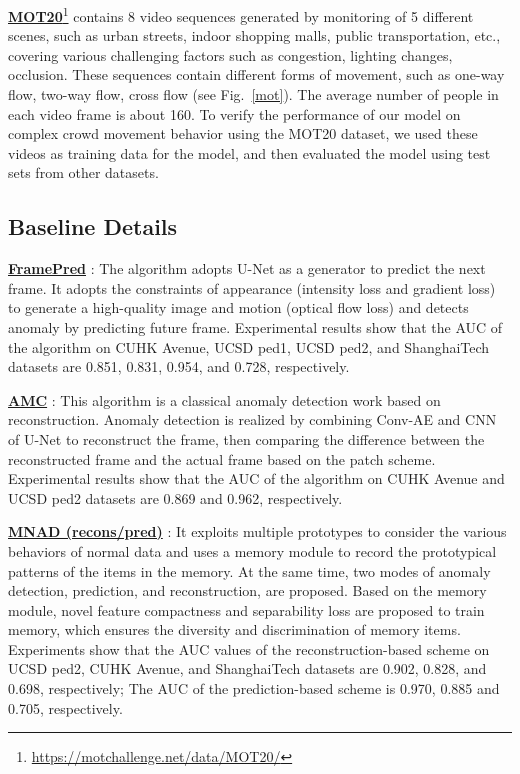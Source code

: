 \documentclass[journal]{IEEEtran}
\begin{document}
\vskip 0.1in
\noindent 
\underline{\textbf{MOT20}}\footnote{\url{https://motchallenge.net/data/MOT20/}} contains 8 video sequences generated by monitoring of 5 different scenes, such as urban streets, indoor shopping malls, public transportation, etc., covering various challenging factors such as congestion, lighting changes, occlusion. These sequences contain different forms of movement, such as one-way flow, two-way flow, cross flow (see Fig.~\ref{mot}). The average number of people in each video frame is about 160. To verify the performance of our model on complex crowd movement behavior using the MOT20 dataset, we used these videos as training data for the model, and then evaluated the model using test sets from other datasets.

\thispagestyle{empty}
\subsection{Baseline Details}\label{appendix:baselines}

\noindent \underline{\textbf{FramePred}} \cite{liu2018future}: The algorithm adopts U-Net as a generator to predict the next frame. It adopts the constraints of appearance (intensity loss and gradient loss) to generate a high-quality image and motion (optical flow loss) and detects anomaly by predicting future frame. Experimental results show that the AUC of the algorithm on CUHK Avenue, UCSD ped1, UCSD ped2, and ShanghaiTech datasets are 0.851, 0.831, 0.954, and 0.728, respectively.

\vskip 0.03in
\noindent \underline{\textbf{AMC}} \cite{nguyen2019anomaly}: This algorithm is a classical anomaly detection work based on reconstruction. Anomaly detection is realized by combining Conv-AE and CNN of U-Net to reconstruct the frame, then comparing the difference between the reconstructed frame and the actual frame based on the patch scheme. Experimental results show that the AUC of the algorithm on CUHK Avenue and UCSD ped2 datasets are 0.869 and 0.962, respectively.

\vskip 0.03in
\noindent \underline{\textbf{MNAD (recons/pred)}} \cite{park2020learning}: It exploits multiple prototypes to consider the various behaviors of normal data and uses a memory module to record the prototypical patterns of the items in the memory. At the same time, two modes of anomaly detection, prediction, and reconstruction, are proposed. Based on the memory module, novel feature compactness and separability loss are proposed to train memory, which ensures the diversity and discrimination of memory items. Experiments show that the AUC values of the reconstruction-based scheme on UCSD ped2, CUHK Avenue, and ShanghaiTech datasets are 0.902, 0.828, and 0.698, respectively; The AUC of the prediction-based scheme is 0.970, 0.885 and 0.705, respectively.
\end{document}
